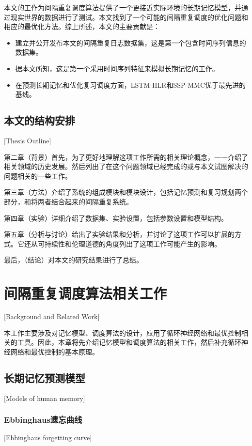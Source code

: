 本文的工作为间隔重复调度算法提供了一个更接近实际环境的长期记忆模型，并通过现实世界的数据进行了测试。本文找到了一个可能的间隔重复调度的优化问题和相应的最优化方法。综上所述，本文的主要贡献是：

\begin{itemize}
    \item 建立并公开发布本文的间隔重复日志数据集，这是第一个包含时间序列信息的数据集。
    \item 据本文所知，这是第一个采用时间序列特征来模拟长期记忆的工作。
    \item 在预测长期记忆和优化复习调度方面，LSTM-HLR和SSP-MMC优于最先进的基线。
\end{itemize}

\section{本文的结构安排}[Thesis Outline]

第二章（背景）首先，为了更好地理解这项工作所需的相关理论概念，一一介绍了相关领域的历史发展。然后列出了在这个问题领域已经完成的或与本文试图解决的问题相关的一些工作。

第三章（方法）介绍了系统的组成模块和模块设计，包括记忆预测和复习规划两个部分，和将两者结合起来的间隔重复系统。

第四章（实验）详细介绍了数据集、实验设置，包括参数设置和模型结构。

第五章（分析与讨论）给出了实验结果和分析，并讨论了这项工作可以扩展的方式。它还从可持续性和伦理道德的角度列出了这项工作可能产生的影响。

最后，（结论）对本文的研究结果进行了总结。

\chapter{间隔重复调度算法相关工作}[Background and Related Work]

本工作主要涉及对记忆模型、调度算法的设计，应用了循环神经网络和最优控制相关的工具。因此，本章将先介绍记忆模型和调度算法的相关工作，然后补充循环神经网络和最优控制的基本原理。

\section{长期记忆预测模型}[Models of human memory]

\subsection{Ebbinghaus遗忘曲线}[Ebbinghaus forgetting curve]

